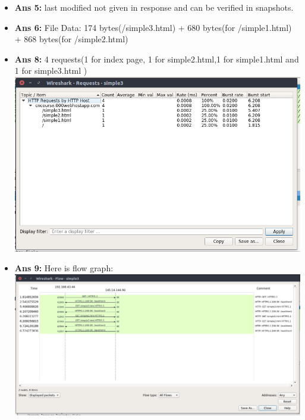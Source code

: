 \documentclass[14pt]{extarticle}
\begin{document}
    \begin{itemize}
        \item \textbf{Ans 5:} last modified not given in response and can be verified in snapshots.
        \item \textbf{Ans 6:} File Data: 174 bytes(/simple3.html) + 680 bytes(for /simple1.html) + 868 bytes(for /simple2.html)
        \item \textbf{Ans 8:} 4 requests(1 for index page, 1 for simple2.html,1 for simple1.html and 1 for simple3.html )\\[10pt]
        \includegraphics[scale=0.40]{1_11_3}\\[10pt]
        \item \textbf{Ans 9:} Here is flow graph:\\[10pt]
        \includegraphics[scale=0.40]{1_11_4}\\[10pt]
    \end{itemize}
    \vspace{1cm}
\end{document}
